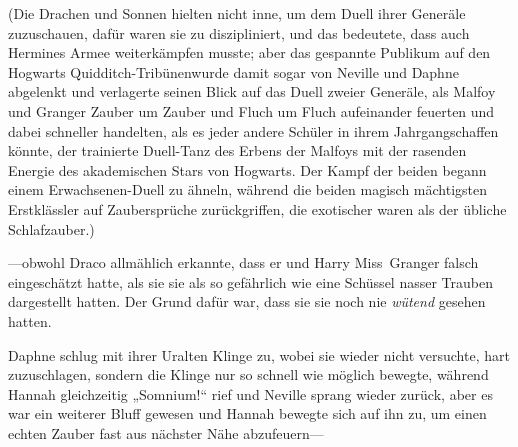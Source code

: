 (Die Drachen und Sonnen hielten nicht inne, um dem Duell ihrer Generäle zuzuschauen, dafür waren sie zu diszipliniert, und das bedeutete, dass auch Hermines Armee weiterkämpfen musste; aber das gespannte Publikum auf den Hogwarts Quidditch-Tribünenwurde damit sogar von Neville und Daphne abgelenkt und verlagerte seinen Blick auf das Duell zweier Generäle, als Malfoy und Granger Zauber um Zauber und Fluch um Fluch aufeinander feuerten und dabei schneller handelten, als es jeder andere Schüler in ihrem Jahrgangschaffen könnte, der trainierte Duell-Tanz des Erbens der Malfoys mit der rasenden Energie des akademischen Stars von Hogwarts. Der Kampf der beiden begann einem Erwachsenen-Duell zu ähneln, während die beiden magisch mächtigsten Erstklässler auf Zaubersprüche zurückgriffen, die exotischer waren als der übliche Schlafzauber.)

—obwohl Draco allmählich erkannte, dass er und Harry Miss~Granger falsch eingeschätzt hatte, als sie sie als so gefährlich wie eine Schüssel nasser Trauben dargestellt hatten. Der Grund dafür war, dass sie sie noch nie \emph{wütend} gesehen hatten.

\later

Daphne schlug mit ihrer Uralten Klinge zu, wobei sie wieder nicht versuchte, hart zuzuschlagen, sondern die Klinge nur so schnell wie möglich bewegte, während Hannah gleichzeitig „Somnium!“ rief und Neville sprang wieder zurück, aber es war ein weiterer Bluff gewesen und Hannah bewegte sich auf ihn zu, um einen echten Zauber fast aus nächster Nähe abzufeuern—

